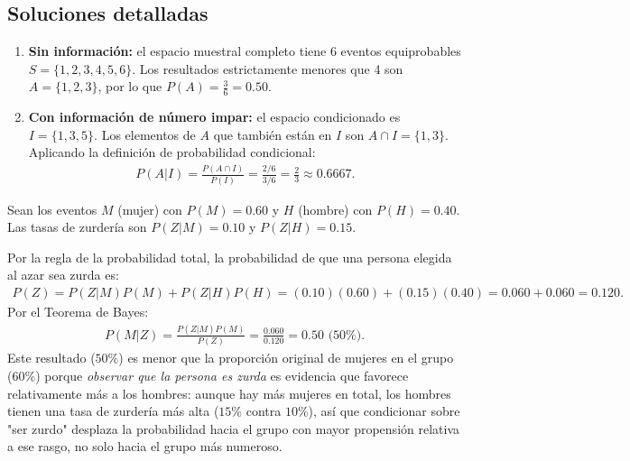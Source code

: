 \subsection*{Soluciones detalladas}

\begin{solproblema}[prob:054ed26]
	\begin{enumerate}
		\item \textbf{Sin información:} el espacio muestral completo tiene 6 eventos equiprobables $S=\{1,2,3,4,5,6\}$. Los resultados estrictamente menores que 4 son $A=\{1,2,3\}$, por lo que $P(A) = \frac{3}{6} = 0.50$.
		\item \textbf{Con información de número impar:} el espacio condicionado es $I=\{1,3,5\}$. Los elementos de $A$ que también están en $I$ son $A \cap I = \{1,3\}$. Aplicando la definición de probabilidad condicional:
		\begin{align}
			P(A|I) = \frac{P(A \cap I)}{P(I)} = \frac{2/6}{3/6} = \frac{2}{3} \approx 0.6667.
		\end{align}
	\end{enumerate}
\end{solproblema}

\begin{solproblema}
	Sean los eventos $M$ (mujer) con $P(M)=0.60$ y $H$ (hombre) con $P(H)=0.40$. Las tasas de zurdería son $P(Z|M)=0.10$ y $P(Z|H)=0.15$.

	Por la regla de la probabilidad total, la probabilidad de que una persona elegida al azar sea zurda es:
	\begin{align}
		P(Z) = P(Z|M)P(M) + P(Z|H)P(H) = (0.10)(0.60) + (0.15)(0.40) = 0.060 + 0.060 = 0.120.
	\end{align}
	Por el Teorema de Bayes:
	\begin{align}
		P(M|Z) = \frac{P(Z|M)P(M)}{P(Z)} = \frac{0.060}{0.120} = 0.50 \text{ (50\%).}
	\end{align}
	Este resultado ($50\%$) es menor que la proporción original de mujeres en el grupo ($60\%$) porque \emph{observar que la persona es zurda} es evidencia que favorece relativamente más a los hombres: aunque hay más mujeres en total, los hombres tienen una tasa de zurdería más alta ($15\%$ contra $10\%$), así que condicionar sobre "ser zurdo" desplaza la probabilidad hacia el grupo con mayor propensión relativa a ese rasgo, no solo hacia el grupo más numeroso.
\end{solproblema}


